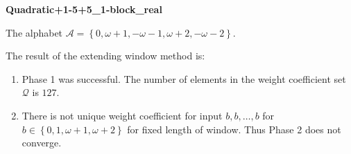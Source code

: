 \begin{exmp}
\textbf{ Quadratic+1-5+5\_1-block\_real }

\label{ex:Quadratic+1-5+51-blockreal}

The alphabet $\mathcal{A} =\left\{0, \omega + 1, -\omega - 1, \omega + 2, -\omega - 2\right\}$.

The result of the extending window method is:
\begin{enumerate}
    \item Phase 1 was successful.
The number of elements in the weight coefficient set $\mathcal{Q}$ is $127$.

    \item There is not unique weight coefficient for input $b,b,\dots,b$ for $b\in\left\{0, 1, \omega + 1, \omega + 2\right\}$ for fixed length of window. Thus Phase 2 does not converge.

\end{enumerate}
\end{exmp}
